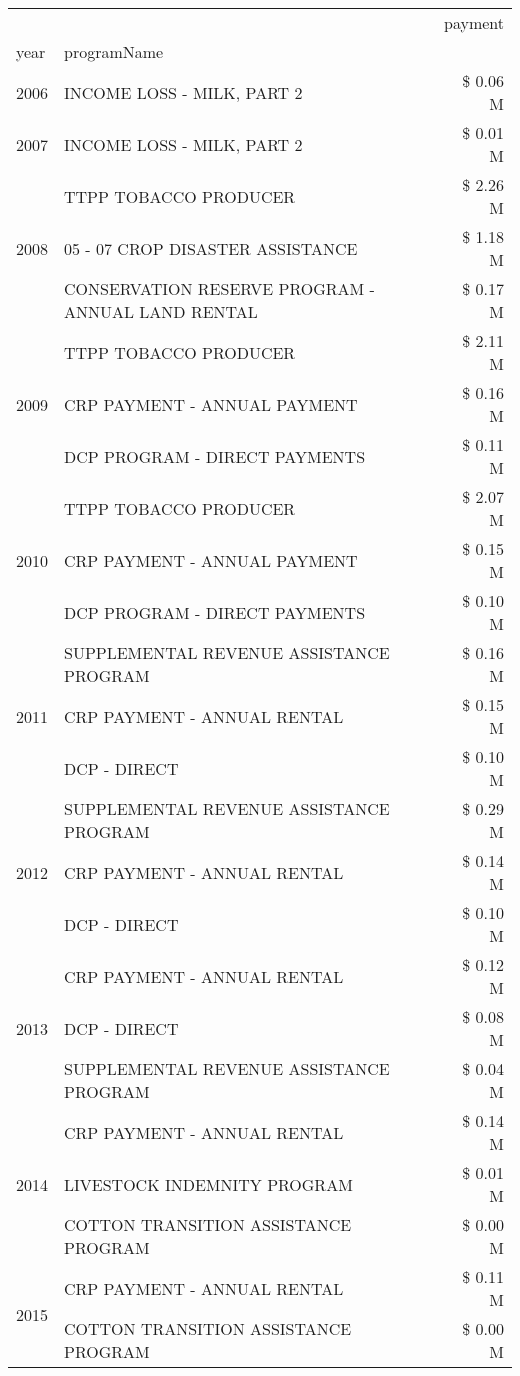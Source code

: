 \begin{tabular}{llr}
\toprule
 &  & payment \\
year & programName &  \\
\midrule
2006 & INCOME LOSS - MILK, PART 2 & \$ 0.06 M \\
\cline{1-3}
2007 & INCOME LOSS - MILK, PART 2 & \$ 0.01 M \\
\cline{1-3}
\multirow[t]{3}{*}{2008} & TTPP TOBACCO PRODUCER & \$ 2.26 M \\
 & 05 - 07 CROP DISASTER ASSISTANCE & \$ 1.18 M \\
 & CONSERVATION RESERVE PROGRAM - ANNUAL LAND RENTAL & \$ 0.17 M \\
\cline{1-3}
\multirow[t]{3}{*}{2009} & TTPP TOBACCO PRODUCER & \$ 2.11 M \\
 & CRP PAYMENT - ANNUAL PAYMENT & \$ 0.16 M \\
 & DCP PROGRAM - DIRECT PAYMENTS & \$ 0.11 M \\
\cline{1-3}
\multirow[t]{3}{*}{2010} & TTPP TOBACCO PRODUCER & \$ 2.07 M \\
 & CRP PAYMENT - ANNUAL PAYMENT & \$ 0.15 M \\
 & DCP PROGRAM - DIRECT PAYMENTS & \$ 0.10 M \\
\cline{1-3}
\multirow[t]{3}{*}{2011} & SUPPLEMENTAL REVENUE ASSISTANCE PROGRAM & \$ 0.16 M \\
 & CRP PAYMENT - ANNUAL RENTAL & \$ 0.15 M \\
 & DCP - DIRECT & \$ 0.10 M \\
\cline{1-3}
\multirow[t]{3}{*}{2012} & SUPPLEMENTAL REVENUE ASSISTANCE PROGRAM & \$ 0.29 M \\
 & CRP PAYMENT - ANNUAL RENTAL & \$ 0.14 M \\
 & DCP - DIRECT & \$ 0.10 M \\
\cline{1-3}
\multirow[t]{3}{*}{2013} & CRP PAYMENT - ANNUAL RENTAL & \$ 0.12 M \\
 & DCP - DIRECT & \$ 0.08 M \\
 & SUPPLEMENTAL REVENUE ASSISTANCE PROGRAM & \$ 0.04 M \\
\cline{1-3}
\multirow[t]{3}{*}{2014} & CRP PAYMENT - ANNUAL RENTAL & \$ 0.14 M \\
 & LIVESTOCK INDEMNITY PROGRAM & \$ 0.01 M \\
 & COTTON TRANSITION ASSISTANCE PROGRAM & \$ 0.00 M \\
\cline{1-3}
\multirow[t]{2}{*}{2015} & CRP PAYMENT - ANNUAL RENTAL & \$ 0.11 M \\
 & COTTON TRANSITION ASSISTANCE PROGRAM & \$ 0.00 M \\

\end{tabular}
